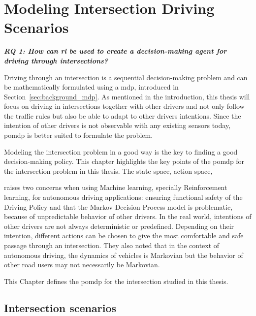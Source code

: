 \chapter{Modeling Intersection Driving Scenarios}
\label{ch:modeling_intersection}
\begin{center}
  \textit{\textbf{RQ 1: How can \gls{rl} be used to create a decision-making agent for driving through intersections?}}
  \end{center}
  \vspace{12pt}
  
Driving through an intersection is a sequential decision-making problem and can be mathematically formulated using a \gls{mdp}, introduced in Section~\ref{sec:background_mdp}. As mentioned in the introduction, this thesis will focus on driving in intersections together with other drivers and not only follow the traffic rules but also be able to adapt to other drivers intentions. Since the intention of other drivers is not observable with any existing sensors today, \gls{pomdp} is better suited to formulate the problem. 

Modeling the intersection problem in a good way is the key to finding a good decision-making policy. This chapter highlights the key points of the \gls{pomdp} for the intersection problem in this thesis. The state space, action space, 
 


 raises two concerns when using Machine learning, specially Reinforcement learning, for autonomous driving applications: ensuring functional safety of the Driving Policy and that the Markov Decision Process model is problematic, because of unpredictable behavior of other drivers.
In the real world, intentions of other drivers are not always deterministic or predefined. Depending on their intention, different actions can be chosen to give the most comfortable and safe passage through an intersection.
They also noted that in the context of autonomous driving, the dynamics of vehicles is Markovian but the behavior of other road users may not necessarily be Markovian.

This Chapter defines the \gls{pomdp} for the intersection studied in this thesis. 

\section{Intersection scenarios}

